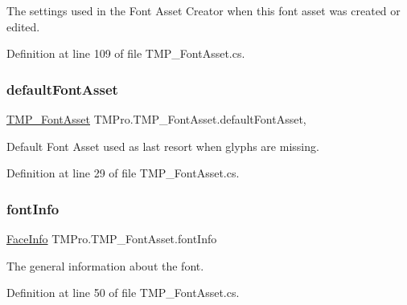 The settings used in the Font Asset Creator when this font asset was created or edited. 



Definition at line 109 of file T\+M\+P\+\_\+\+Font\+Asset.\+cs.

\mbox{\label{class_t_m_pro_1_1_t_m_p___font_asset_abeca04093d0ee5e19bd3a1f2527b54fd}} 
\subsubsection{\texorpdfstring{defaultFontAsset}{defaultFontAsset}}
{\footnotesize\ttfamily \mbox{\hyperlink{class_t_m_pro_1_1_t_m_p___font_asset}{T\+M\+P\+\_\+\+Font\+Asset}} T\+M\+Pro.\+T\+M\+P\+\_\+\+Font\+Asset.\+default\+Font\+Asset\hspace{0.3cm}{\ttfamily [static]}, {\ttfamily [get]}}



Default Font Asset used as last resort when glyphs are missing. 



Definition at line 29 of file T\+M\+P\+\_\+\+Font\+Asset.\+cs.

\mbox{\label{class_t_m_pro_1_1_t_m_p___font_asset_a6afd05863cb5c5f39221cc63904b3f90}} 
\subsubsection{\texorpdfstring{fontInfo}{fontInfo}}
{\footnotesize\ttfamily \mbox{\hyperlink{class_t_m_pro_1_1_face_info}{Face\+Info}} T\+M\+Pro.\+T\+M\+P\+\_\+\+Font\+Asset.\+font\+Info\hspace{0.3cm}{\ttfamily [get]}}



The general information about the font. 



Definition at line 50 of file T\+M\+P\+\_\+\+Font\+Asset.\+cs.

\mbox{\label{class_t_m_pro_1_1_t_m_p___font_asset_a0e8bcaaecbbd7d452709fbc92814c92e}} 
